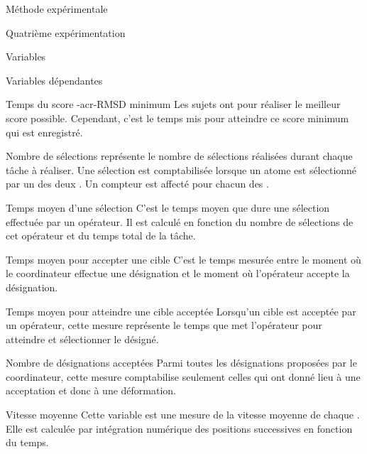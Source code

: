 \documentclass[myfrancais,ngerman,english,french]{mythesis}
\begin{document}
\begin{mychapter}{Méthode expérimentale}
\begin{mysection}{Quatrième expérimentation}
\begin{mysubsection}{Variables}
\begin{mysubsubsection}{Variables dépendantes}
\begin{myparagraph}{ Temps du score \myacronl-{acr-RMSD} minimum}
						Les sujets ont  pour réaliser le meilleur score  possible.
						Cependant, c'est le temps mis pour atteindre ce score minimum qui est enregistré.
					\end{myparagraph}
					\begin{myparagraph}{ Nombre de sélections}
						 représente le nombre de sélections réalisées durant chaque tâche à réaliser.
						Une sélection est comptabilisée lorsque un atome est sélectionné par un des deux .
						Un compteur est affecté pour chacun des .
					\end{myparagraph}
					\begin{myparagraph}{ Temps moyen d'une sélection}
						C'est le temps moyen que dure une sélection effectuée par un opérateur.
						Il est calculé en fonction du nombre de sélections de cet opérateur et du temps total de la tâche.
					\end{myparagraph}
					\begin{myparagraph}{ Temps moyen pour accepter une cible}
						C'est le temps mesurée entre le moment où le coordinateur effectue une désignation et le moment où l'opérateur accepte la désignation.
					\end{myparagraph}
					\begin{myparagraph}{ Temps moyen pour atteindre une cible acceptée}
						Lorsqu'un cible est acceptée par un opérateur, cette mesure représente le temps que met l'opérateur pour atteindre et sélectionner le  désigné.
					\end{myparagraph}
					\begin{myparagraph}{ Nombre de désignations acceptées}
						Parmi toutes les désignations proposées par le coordinateur, cette mesure comptabilise seulement celles qui ont donné lieu à une acceptation et donc à une déformation.
					\end{myparagraph}
					\begin{myparagraph}{ Vitesse moyenne}
						Cette variable est une mesure de la vitesse moyenne de chaque .
						Elle est calculée par intégration numérique des positions successives en fonction du temps.

\end{myparagraph}
\end{mysubsubsection}
\end{mysubsection}
\end{mysection}
\end{mychapter}
\end{document}
